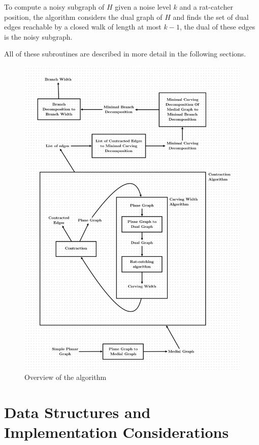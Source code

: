 \documentclass{article}
\begin{document}
	To compute a noisy subgraph of $H$ given a noise level $k$ and a rat-catcher position, the algorithm considers the dual graph of $H$ and finds the set of dual edges reachable by a closed walk of length at most $k-1$, the dual of these edges is the noisy subgraph.

	All of these subroutines are described in more detail in the following sections.

	\begin{figure}[H]
		\centering
		\includegraphics[width=\textwidth]{./images/overview.png}
		\caption{Overview of the algorithm}
		\label{fig:overview}
	\end{figure}

\section{Data Structures and Implementation Considerations}
\end{document}
